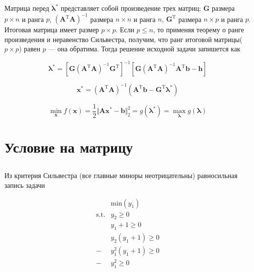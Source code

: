 	Матрица перед $\boldsymbol{\lambda}^{*}$ представляет собой произведение трех матриц: $\mathbf{G}$ размера $p\times n$ и ранга $p$, $(\mathbf{A}^{\text{T}}\mathbf{A})^{-1}$ размера $n\times n$ и ранга $n$, $\mathbf{G}^{\text{T}}$ размера $n\times p$ и ранга $p$. Итоговая матрица имеет размер $p \times p$. Если $p \leqslant n$, то применяя теорему о ранге произведения и неравенство Сильвестра, получим, что ранг итоговой матрицы($p \times p$) равен $p$ --- она обратима. Тогда решение исходной задачи запишется как
	
	\begin{equation}
	\boldsymbol{\lambda}^{*} =\left[ \mathbf{G}(\mathbf{A}^{\text{T}}\mathbf{A})^{-1}\mathbf{G}^{\text{T}}\right] ^{-1} \left[\mathbf{G}(\mathbf{A}^{\text{T}}\mathbf{A})^{-1}\mathbf{A}^{\text{T}}\mathbf{b} - \mathbf{h} \right] 
	\end{equation}
	
	\begin{equation}
	\mathbf{x}^{*} =(\mathbf{A}^{\text{T}}\mathbf{A})^{-1}(\mathbf{A}^{\text{T}}\mathbf{b} -\mathbf{G}^{\text{T}}\boldsymbol{\lambda}^{*})
	\end{equation}
	
	\begin{equation}
	\min_{\mathbf{x}} f(\mathbf{x}) = \frac 12 \Vert \mathbf{A}\mathbf{x}^{*}-\mathbf{b} \Vert_2^2 =  g(\boldsymbol{\lambda}^{*})=\max_{\boldsymbol{\lambda}} g(\boldsymbol{\lambda})
	\end{equation}
	
	\section{Условие на матрицу}
	
	\subsection{}

	Из критерия Сильвестра (все главные миноры неотрицательны) равносильная запись задачи
	
	\begin{equation}
	\begin{split}
	&\text{min}( y_1)\\
	\text{s.t.}&y_2 \geqslant 0\\
	&y_1+1 \geqslant 0\\
	&y_2(y_1+1) \geqslant 0\\
	-&y_1^2(y_1+1) \geqslant 0\\
	-&y_1^2 \geqslant 0
	\end{split}
	\end{equation}
	
